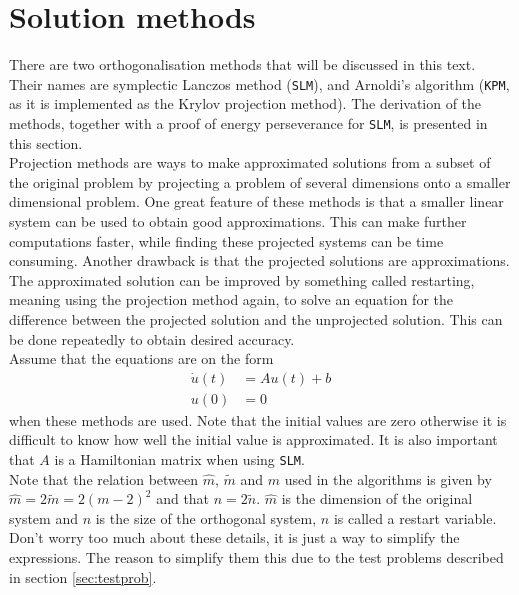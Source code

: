 \section{Solution methods} \label{sec:solmet} %
\label{sec:KPM}
\noindent There are two orthogonalisation methods that will be discussed in this text. Their names are symplectic Lanczos method (\texttt{SLM}), and Arnoldi's algorithm (\texttt{KPM}, as it is implemented as the Krylov projection method). The derivation of the methods, together with a proof of energy perseverance for \texttt{SLM}, is presented in this section. \\


\noindent Projection methods are ways to make approximated solutions from a subset of the original problem by projecting a problem of several dimensions onto a smaller dimensional problem. One great feature of these methods is that a smaller linear system can be used to obtain good approximations. This can make further computations faster, while finding these projected systems can be time consuming. Another drawback is that the projected solutions are approximations. The approximated solution can be improved by something called restarting, meaning using the projection method again, to solve an equation for the difference between the projected solution and the unprojected solution. This can be done repeatedly to obtain desired accuracy. \\

\noindent Assume that the equations are on the form
\begin{equation}
\begin{aligned}
\dot{u}(t) &= Au(t) + b \\
u(0) &= 0
\end{aligned}
\label{eqn:PMform}
\end{equation}
\noindent when these methods are used. Note that the initial values are zero otherwise it is difficult to know how well the initial value is approximated. It is also important that $A$ is a Hamiltonian matrix when using \texttt{SLM}. \\

\noindent Note that the relation between $\hat{m}$, $\tilde{m}$ and $m$ used in the algorithms is given by $\hat{m} = 2\tilde{m}= 2(m-2)^2$ and that $ n = 2\tilde{n}$. $\hat{m}$ is the dimension of the original system and $n$ is the size of the orthogonal system, $n$ is called a restart variable. Don't worry too much about these details, it is just a way to simplify the expressions. The reason to simplify them this due to the test problems described in section \ref{sec:testprob}. \\

